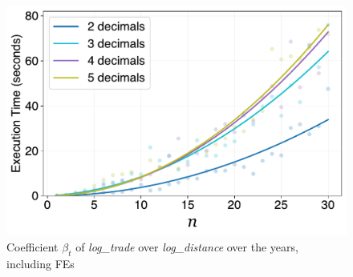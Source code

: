 \documentclass[../main.tex]{subfiles}
\begin{document}
\newpage

\begin{figure}[H]
    \centering
    \includegraphics[width=0.6\linewidth]{decimals.pdf}
    \vspace{-0.25cm}
\caption{Coefficient $\beta_t$ of \textit{log\_trade} over \textit{log\_distance} over the years, including FEs}
\end{figure}
\end{document}
